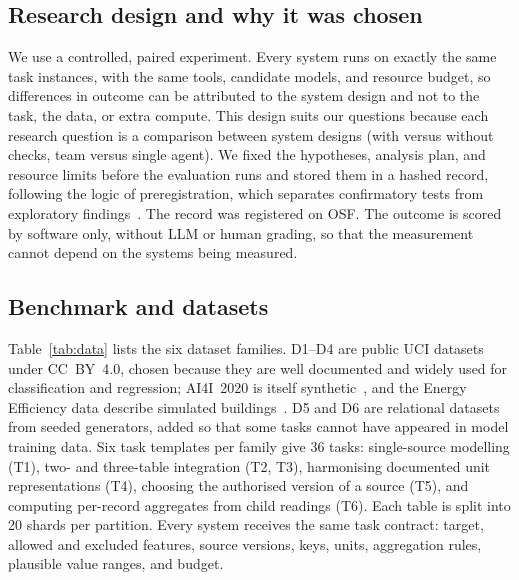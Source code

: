 \documentclass[conference]{IEEEtran}
\begin{document}
\subsection{Research design and why it was chosen}
We use a controlled, paired experiment. Every system runs on exactly the same task instances, with the same tools,
candidate models, and resource budget, so differences in outcome can be attributed to the system design and not to
the task, the data, or extra compute. This design suits our questions because each research question is a
comparison between system designs (with versus without checks, team versus single agent). We fixed the hypotheses,
analysis plan, and resource limits before the evaluation runs and stored them in a hashed record, following the logic
of preregistration, which separates confirmatory tests from exploratory findings~\cite{nosek2018prereg}. The record
was registered on OSF. The outcome is scored by software only, without LLM or human grading, so that the measurement
cannot depend on the systems being measured.

\subsection{Benchmark and datasets}
\label{sec:bench}
Table~\ref{tab:data} lists the six dataset families. D1--D4 are public UCI datasets under CC~BY~4.0, chosen because
they are well documented and widely used for classification and regression; AI4I~2020 is itself
synthetic~\cite{matzka2020ai4i}, and the Energy Efficiency data describe simulated buildings~\cite{tsanas2012energy}.
D5 and D6 are relational datasets from seeded generators, added so that some tasks cannot have appeared in model
training data. Six task templates per family give 36 tasks: single-source modelling (T1), two- and three-table
integration (T2, T3), harmonising documented unit representations (T4), choosing the authorised version of a source
(T5), and computing per-record aggregates from child readings (T6). Each table is split into 20 shards per partition.
Every system receives the same task contract: target, allowed and excluded features, source versions, keys, units,
aggregation rules, plausible value ranges, and budget.
\end{document}
